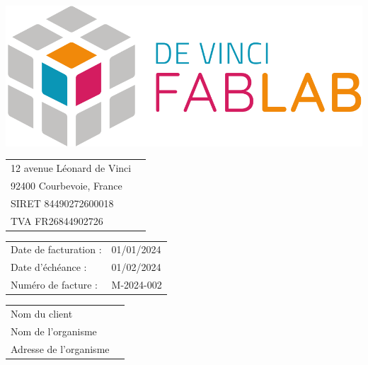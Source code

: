 \documentclass[12pt,a4paper]{article}
\begin{document}
\thispagestyle{empty}


\begin{minipage}{0.39\textwidth}
    \includegraphics[width=0.6\linewidth]{../assets/logo_fablab.png}

    \vspace{0.5cm}

    \begin{tabular}{ll}
        12 avenue Léonard de Vinci \\
        92400 Courbevoie, France   \\
        SIRET 84490272600018       \\
        TVA  FR26844902726         \\
    \end{tabular}
\end{minipage}
\begin{minipage}{0.6\textwidth}
    \begin{flushright}
        \begin{tabular}{ll}
            Date de facturation : & 01/01/2024 \\
            Date d'échéance :     & 01/02/2024 \\
            Numéro de facture :   & M-2024-002 \\
        \end{tabular}
    \end{flushright}
\end{minipage}
\begin{flushright}
    \begin{minipage}[t]{0.5\textwidth}
        \begin{framed}
            \begin{tabular}{ll}
                Nom du client          \\
                Nom de l'organisme     \\
                Adresse de l'organisme \\
            \end{tabular}
        \end{framed}
    \end{minipage}
\end{flushright}
\end{document}
